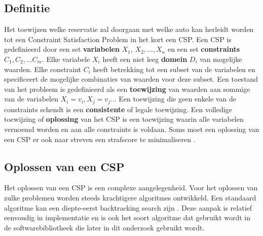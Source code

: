 \subsection{Definitie}
Het toewijzen welke reservatie zal doorgaan met welke auto kan herleidt worden tot een Constraint Satisfaction Problem in het kort een CSP. Een CSP is gedefinieerd door een set \textbf{variabelen} $X_{1}$, $X_{2},...,X_{n}$ en een set \textbf{constraints} $C_{1}, C_{2},...C_{m}$. Elke variabele $X_{i}$ heeft een niet leeg \textbf{domein} $D_{i}$ van mogelijke waarden. Elke constraint $C_{i}$ heeft betrekking tot een subset van de variabelen en specificeert de mogelijke combinaties van waarden voor deze subset. Een toestand van het probleem is gedefinieerd als een \textbf{toewijzing} van waarden aan sommige van de variabelen $X_{i} =  v_{i}, X_{j} = v_{j}$... Een toewijzing die geen enkele van de constraints schendt is een \textbf{consistente} of legale toewijzing. Een volledige toewijzing of \textbf{oplossing} van het CSP is een toewijzing waarin alle variabelen vernoemd worden en aan alle constraints is voldaan. Soms moet een oplossing van een CSP er ook naar streven een strafscore te minimaliseren \autocite{norvig}.

\subsection{Oplossen van een CSP}
Het oplossen van een CSP is een complexe aangelegenheid. Voor het oplossen van zulke problemen worden steeds krachtigere algoritmes ontwikkeld. Een standaard algoritme kan een diepte-eerst backtracking search zijn \autocite{norvig}. Deze aanpak is relatief eenvoudig in implementatie en is ook het soort algoritme dat gebruikt wordt in de softwarebibliotheek die later in dit onderzoek gebruikt wordt.
